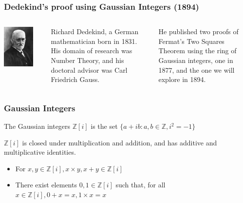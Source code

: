 \documentclass{beamer}
\begin{document}
\begin{frame}
	\frametitle{Dedekind's proof using Gaussian Integers (1894)}
	\begin{columns}
		\begin{center}
			\includegraphics[width=0.8\textwidth]{Richard_Dedekind_1900s.jpg}
		\end{center}
		Richard Dedekind, a German mathematician born in 1831.
		His domain of research was Number Theory, and his doctoral advisor was
		Carl Friedrich Gauss.
		
		He published two proofs of Fermat's Two Squares Theorem using the ring of
		Gaussian integers, one in 1877, and the one we will explore in 1894.

	\end{columns}
\end{frame}

\begin{frame}
	\frametitle{Gaussian Integers}
	The Gaussian integers $\mathbb{Z}[i]$ is the set 
	$\{a+ib:a, b \in \mathbb{Z}, i^2 = -1 \}$

	$\mathbb{Z}[i]$ is closed under multiplication and addition, and has additive and
	multiplicative identities.
	\begin{itemize}
		\item For $x,y \in \mathbb{Z}[i], x \times y, x + y \in \mathbb{Z}[i]$
		\item There exist elements $0, 1 \in \mathbb{Z}[i]$ such that, for all
			$x \in \mathbb{Z}[i], 0+x = x, 1 \times x = x$
	\end{itemize}
\end{frame}
\end{document}
